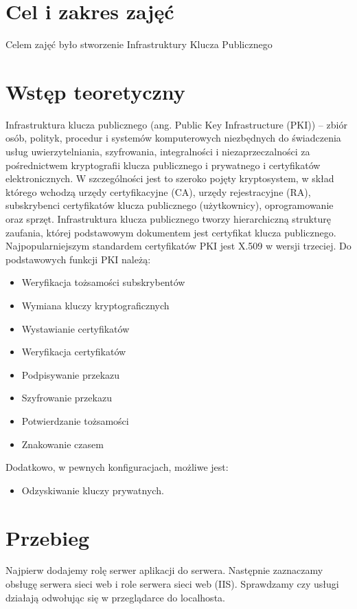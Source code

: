 \documentclass[a4paper,twoside,12pt]{mgr}
\begin{document}
\stronaTytulowa

\tableofcontents
\chapter{Cel i zakres zajęć}
Celem zajęć było stworzenie Infrastruktury Klucza Publicznego

\chapter{Wstęp teoretyczny}
Infrastruktura klucza publicznego (ang. Public Key Infrastructure (PKI)) – zbiór osób, polityk, procedur i systemów komputerowych niezbędnych do świadczenia usług uwierzytelniania, szyfrowania, integralności i niezaprzeczalności za pośrednictwem kryptografii klucza publicznego i prywatnego i certyfikatów elektronicznych.
W szczególności jest to szeroko pojęty kryptosystem, w skład którego wchodzą urzędy certyfikacyjne (CA), urzędy rejestracyjne (RA), subskrybenci certyfikatów klucza publicznego (użytkownicy), oprogramowanie oraz sprzęt. Infrastruktura klucza publicznego tworzy hierarchiczną strukturę zaufania, której podstawowym dokumentem jest certyfikat klucza publicznego. Najpopularniejszym standardem certyfikatów PKI jest X.509 w wersji trzeciej.
Do podstawowych funkcji PKI należą:
\begin{itemize}
\item Weryfikacja tożsamości subskrybentów
\item Wymiana kluczy kryptograficznych
\item Wystawianie certyfikatów
\item Weryfikacja certyfikatów
\item Podpisywanie przekazu
\item Szyfrowanie przekazu
\item Potwierdzanie tożsamości
\item Znakowanie czasem
\end{itemize}
Dodatkowo, w pewnych konfiguracjach, możliwe jest:
\begin{itemize}
\item Odzyskiwanie kluczy prywatnych.
\end{itemize}
\chapter{Przebieg}
Najpierw dodajemy rolę serwer aplikacji do serwera. Następnie zaznaczamy obsługę serwera sieci web i role serwera sieci web (IIS). Sprawdzamy czy usługi działają odwołując się w przeglądarce do localhosta.
\end{document}
